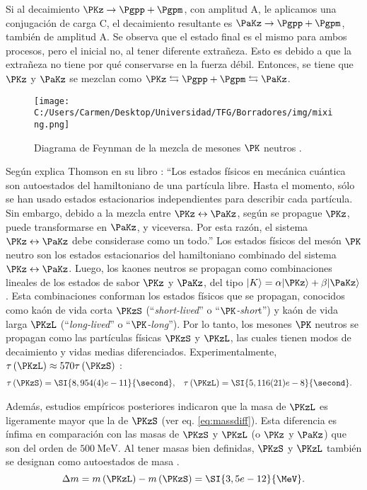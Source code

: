 Si al decaimiento $\PKz \rightarrow \Pgpp + \Pgpm$, con amplitud A, le aplicamos una conjugación de carga C, el decaimiento resultante es $\PaKz \rightarrow \Pgpp + \Pgpm$, también de amplitud A. Se observa que el estado final es el mismo para ambos procesos, pero el inicial no, al tener diferente extrañeza. Esto es debido a que la extrañeza no tiene por qué conservarse en la fuerza débil. Entonces, se tiene que $\PKz$ y $\PaKz$ se mezclan como $\PKz \leftrightarrows \Pgpp + \Pgpm \leftrightarrows \PaKz$.

\begin{figure}[!ht]
	\centering
	\texttt{[image: C:/Users/Carmen/Desktop/Universidad/TFG/Borradores/img/mixing.png]}
	\caption[Diagrama de Feynmann de la mezcla de mesones $\PK$ neutros]
	{Diagrama de Feynman de la mezcla de mesones $\PK$ neutros \cite{Thomson}.}
	\label{fig:kaonmix}
\end{figure}

Según explica Thomson en su libro \cite{Thomson}: ``Los estados físicos en mecánica cuántica son autoestados del hamiltoniano de una partícula libre. Hasta el momento, sólo se han usado estados estacionarios independientes para describir cada partícula. Sin embargo, debido a la mezcla entre $\PKz \leftrightarrow \PaKz$, según se propague $\PKz$, puede transformarse en $\PaKz$, y viceversa. Por esta razón, el sistema $\PKz \leftrightarrow \PaKz$ debe considerase como un todo.'' Los estados físicos del mesón $\PK$ neutro son los estados estacionarios del hamiltoniano combinado del sistema $\PKz \leftrightarrow \PaKz$. Luego, los kaones neutros se propagan como combinaciones lineales de los estados de sabor $\PKz$ y $\PaKz$, del tipo $|K\rangle=\alpha|\PKz\rangle+\beta|\PaKz\rangle$. Esta combinaciones conforman los estados físicos que se propagan, conocidos como kaón de vida corta $\PKzS$ (``\textit{short-lived}'' o ``\textit{$\PK$-shor}t'') y kaón de vida larga $\PKzL$ (``\textit{long-lived}'' o ``\textit{$\PK$-long}''). Por lo tanto, los mesones $\PK$ neutros se propagan como las partículas físicas $\PKzS$ y $\PKzL$, las cuales tienen modos de decaimiento y vidas medias diferenciados. Experimentalmente, $\tau\left(\PKzL\right) \approx 570 \tau\left(\PKzS\right)$ \cite{Zyla}:
\begin{align}
\tau\left(\PKzS\right) &= \SI{8,954(4)e-11}{\second}, & \tau\left(\PKzL\right) &= \SI{5,116(21)e-8}{\second}.
\end{align}

Además, estudios empíricos posteriores indicaron que la masa de $\PKzL$ es ligeramente mayor que la de $\PKzS$ (ver eq. \ref{eq:massdiff}). Esta diferencia es ínfima en comparación con las masas de $\PKzS$ y $\PKzL$ (o $\PKz$ y $\PaKz$) que son del orden de $\SI{500}{\MeV}.$
Al tener masas bien definidas, $\PKzS$ y $\PKzL$ también se designan como autoestados de masa \cite{Thomson}.
\begin{equation}
\Delta m= m\left(\PKzL\right)-m\left(\PKzS\right)=\SI{3,5e-12}{\MeV}.\label{eq:massdiff}
\end{equation}

